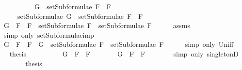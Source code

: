 \begin{isabellebody}
\ \ \ \ \ \ \ \ \ \ {\isachardoublequoteopen}G\ {\isasymin}\ setSubformulae\ {\isacharparenleft}F{}\ \isactrlbold {\isasymrightarrow}\ F{}{\isacharparenright}{\isachardoublequoteclose}\isanewline
\ \ \ \ \ {\isachardoublequoteopen}setSubformulae\ G\ {\isasymsubseteq}\ setSubformulae\ {\isacharparenleft}F{}\ \isactrlbold {\isasymrightarrow}\ F{}{\isacharparenright}{\isachardoublequoteclose}\isanewline
%
\isadelimproof
%
\endisadelimproof
%
\isatagproof
{}\isamarkupfalse%
\ {\isacharminus}\isanewline
\ \ \isamarkupfalse%
\ {\isachardoublequoteopen}G\ {\isasymin}\ {\isacharbraceleft}F{}\ \isactrlbold {\isasymrightarrow}\ F{}{\isacharbraceright}\ {\isasymunion}\ {\isacharparenleft}setSubformulae\ F{}\ {\isasymunion}\ setSubformulae\ F{}{\isacharparenright}{\isachardoublequoteclose}\isanewline
\ \ \ \ \isamarkupfalse%
\ assms{\isacharparenleft}{}{\isacharparenright}\ \isanewline
\ \ \ \ \isamarkupfalse%
\ {\isacharparenleft}simp\ only{\isacharcolon}\ setSubformulae{\isacharunderscore}imp{\isacharparenright}\isanewline
\ \ \isamarkupfalse%
\ \isamarkupfalse%
\ {\isachardoublequoteopen}G\ {\isasymin}\ {\isacharbraceleft}F{}\ \isactrlbold {\isasymrightarrow}\ F{}{\isacharbraceright}\ {\isasymor}\ G\ {\isasymin}\ setSubformulae\ F{}\ {\isasymunion}\ setSubformulae\ F{}{\isachardoublequoteclose}\isanewline
\ \ \ \ \isamarkupfalse%
\ {\isacharparenleft}simp\ only{\isacharcolon}\ Un{\isacharunderscore}iff{\isacharparenright}\isanewline
\ \ \isamarkupfalse%
\ \isamarkupfalse%
\ {\isacharquery}thesis\isanewline
\ \ \isamarkupfalse%
\ \isanewline
\ \ \ \ \isamarkupfalse%
\ {\isachardoublequoteopen}G\ {\isasymin}\ {\isacharbraceleft}F{}\ \isactrlbold {\isasymrightarrow}\ F{}{\isacharbraceright}{\isachardoublequoteclose}\isanewline
\ \ \ \ \isamarkupfalse%
\ \isamarkupfalse%
\ {\isachardoublequoteopen}G\ {\isacharequal}\ F{}\ \isactrlbold {\isasymrightarrow}\ F{}{\isachardoublequoteclose}\isanewline
\ \ \ \ \ \ \isamarkupfalse%
\ {\isacharparenleft}simp\ only{\isacharcolon}\ singletonD{\isacharparenright}\isanewline
\ \ \ \ \isamarkupfalse%
\ \isamarkupfalse%
\ {\isacharquery}thesis\isanewline

\end{isabellebody}

